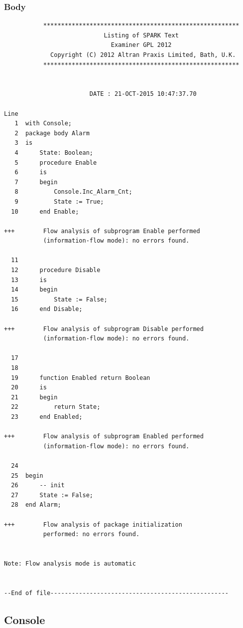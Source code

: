 \documentclass[a4paper, titlepage]{article}
\begin{document}
\subsubsection{Body}
{\tiny
\begin{lstlisting}
           *******************************************************
                            Listing of SPARK Text
                              Examiner GPL 2012
             Copyright (C) 2012 Altran Praxis Limited, Bath, U.K.
           *******************************************************


                        DATE : 21-OCT-2015 10:47:37.70

Line
   1  with Console;
   2  package body Alarm 
   3  is
   4      State: Boolean;
   5      procedure Enable
   6      is
   7      begin
   8          Console.Inc_Alarm_Cnt;
   9          State := True;
  10      end Enable;

+++        Flow analysis of subprogram Enable performed 
           (information-flow mode): no errors found.

  11  
  12      procedure Disable
  13      is
  14      begin
  15          State := False;
  16      end Disable;

+++        Flow analysis of subprogram Disable performed 
           (information-flow mode): no errors found.

  17  
  18  
  19      function Enabled return Boolean
  20      is
  21      begin
  22          return State;
  23      end Enabled;

+++        Flow analysis of subprogram Enabled performed 
           (information-flow mode): no errors found.

  24  
  25  begin
  26      -- init
  27      State := False;
  28  end Alarm;

+++        Flow analysis of package initialization 
           performed: no errors found.


Note: Flow analysis mode is automatic


--End of file--------------------------------------------------

\end{lstlisting}
}
\subsection{Console}
\end{document}
